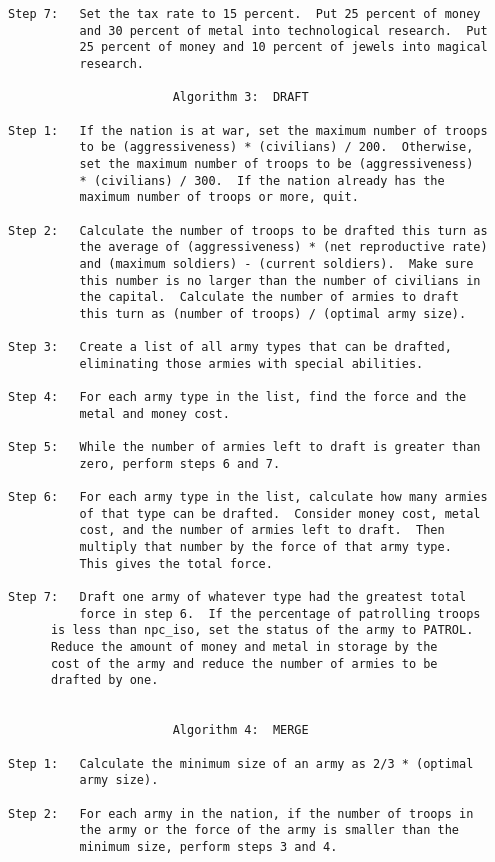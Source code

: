 \begin{verbatim}
Step 7:   Set the tax rate to 15 percent.  Put 25 percent of money
          and 30 percent of metal into technological research.  Put
          25 percent of money and 10 percent of jewels into magical
          research.

                       Algorithm 3:  DRAFT

Step 1:   If the nation is at war, set the maximum number of troops
          to be (aggressiveness) * (civilians) / 200.  Otherwise,
          set the maximum number of troops to be (aggressiveness)
          * (civilians) / 300.  If the nation already has the
          maximum number of troops or more, quit.

Step 2:   Calculate the number of troops to be drafted this turn as
          the average of (aggressiveness) * (net reproductive rate)
          and (maximum soldiers) - (current soldiers).  Make sure
          this number is no larger than the number of civilians in
          the capital.  Calculate the number of armies to draft
          this turn as (number of troops) / (optimal army size).

Step 3:   Create a list of all army types that can be drafted,
          eliminating those armies with special abilities.

Step 4:   For each army type in the list, find the force and the
          metal and money cost.

Step 5:   While the number of armies left to draft is greater than
          zero, perform steps 6 and 7.

Step 6:   For each army type in the list, calculate how many armies
          of that type can be drafted.  Consider money cost, metal
          cost, and the number of armies left to draft.  Then
          multiply that number by the force of that army type. 
          This gives the total force.

Step 7:   Draft one army of whatever type had the greatest total
          force in step 6.  If the percentage of patrolling troops
	  is less than npc_iso, set the status of the army to PATROL.
	  Reduce the amount of money and metal in storage by the
	  cost of the army and reduce the number of armies to be
	  drafted by one.


                       Algorithm 4:  MERGE

Step 1:   Calculate the minimum size of an army as 2/3 * (optimal
          army size).

Step 2:   For each army in the nation, if the number of troops in
          the army or the force of the army is smaller than the
          minimum size, perform steps 3 and 4.


\end{verbatim}
